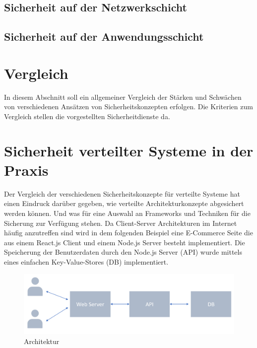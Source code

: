 \documentclass[utf8,biblatex]{lni}
\begin{document}
\subsection{Sicherheit auf der Netzwerkschicht}

\subsection{Sicherheit auf der Anwendungsschicht}




\section{Vergleich}

In diesem Abschnitt soll ein allgemeiner Vergleich der 
Stärken und Schwächen von verschiedenen Ansätzen von Sicherheitskonzepten erfolgen. 
Die Kriterien zum Vergleich stellen die vorgestellten Sicherheitdienste da. 


\section{Sicherheit verteilter Systeme in der Praxis}

Der Vergleich der verschiedenen Sicherheitskonzepte für verteilte Systeme hat einen Eindruck darüber gegeben, wie 
verteilte Architekturkonzepte abgesichert werden können. Und was für eine Auswahl an Frameworks und Techniken für die Sicherung zur Verfügung stehen.
Da Client-Server Architekturen im Internet häufig anzutreffen sind wird in dem folgenden Beispiel eine E-Commerce Seite die aus einem React.js Client und 
einem Node.js Server besteht implementiert. 
Die Speicherung der Benutzerdaten durch den Node.js Server (API) wurde mittels eines einfachen Key-Value-Stores (DB) implementiert. 

\begin{figure}
  \centering
  \includegraphics[width=\textwidth]{images/architektur.png}
  \caption[Architektur]{Architektur} 
  \label{Architektur}
\end{figure} 
\end{document}
